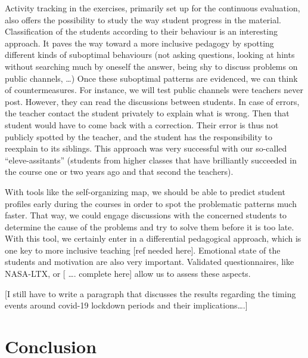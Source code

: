 \documentclass{aims}
\theoremstyle{definition}
\begin{document}
Activity tracking in the exercises, primarily set up for the continuous
evaluation, also offers the possibility to study the way student
progress in the material. Classification of the students according to
their behaviour is an interesting approach. It paves the way toward a
more inclusive pedagogy by spotting different kinds of suboptimal
behaviours (not asking questions, looking at hints without searching
much by oneself the answer, being shy to discuss problems on public
channels, \ldots) Once these suboptimal patterns are evidenced, we can
think of countermeasures. For instance, we will test public channels
were teachers never post. However, they can read the discussions between
students. In case of errors, the teacher contact the student privately
to explain what is wrong. Then that student would have to come back with
a correction. Their error is thus not publicly spotted by the teacher,
and the student has the responsibility to reexplain to its siblings.
This approach was very successful with our so-called ``eleve-assitants''
(students from higher classes that have brilliantly succeeded in the
course one or two years ago and that second the teachers).

With tools like the self-organizing map, we should be able to predict
student profiles early during the courses in order to spot the
problematic patterns much faster. That way, we could engage discussions
with the concerned students to determine the cause of the problems and
try to solve them before it is too late. With this tool, we certainly
enter in a differential pedagogical approach, which is one key to more
inclusive teaching {[}ref needed here{]}. Emotional state of the
students and motivation are also very important. Validated
questionnaires, like NASA-LTX, or {[} \ldots. complete here{]} allow us
to assess these aspects.

{[}I still have to write a paragraph that discusses the results
regarding the timing events around covid-19 lockdown periods and their
implications\ldots.{]}

\hypertarget{conclusion}{%
\section{Conclusion}\label{conclusion}}
\end{document}
